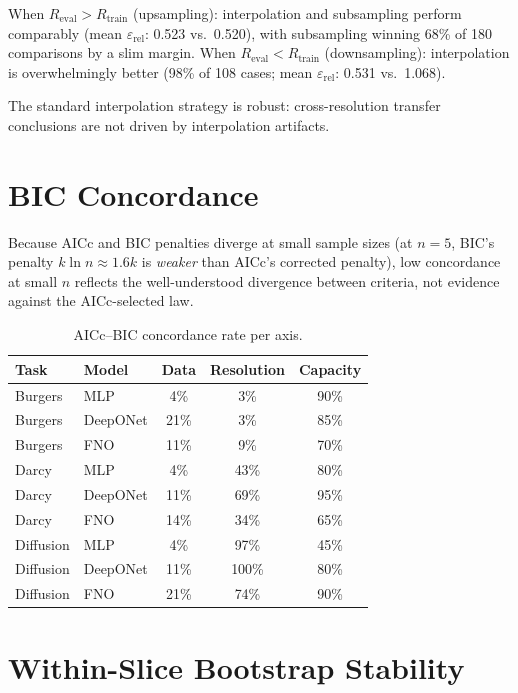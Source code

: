 \documentclass[11pt]{article}
\newcommand{\Reval}{R_{\mathrm{eval}}}
\newcommand{\Rtrain}{R_{\mathrm{train}}}
\newcommand{\relLtwo}{\varepsilon_{\mathrm{rel}}}
\begin{document}
When $\Reval > \Rtrain$ (upsampling): interpolation and subsampling
perform comparably (mean $\relLtwo$: 0.523 vs.\ 0.520), with
subsampling winning 68\% of 180 comparisons by a slim margin.
When $\Reval < \Rtrain$ (downsampling): interpolation is overwhelmingly
better (98\% of 108 cases; mean $\relLtwo$: 0.531 vs.\ 1.068).

The standard interpolation strategy is robust: cross-resolution
transfer conclusions are not driven by interpolation artifacts.


\section{BIC Concordance}
\label{app:bic}

Because AICc and BIC penalties diverge at small sample sizes
(at $n = 5$, BIC's penalty $k \ln n \approx 1.6k$ is \emph{weaker}
than AICc's corrected penalty), low concordance at small $n$ reflects
the well-understood divergence between criteria, not evidence against
the AICc-selected law.

\begin{table}[h]
\centering
\caption{AICc--BIC concordance rate per axis.}
\label{tab:bic}
\begin{tabular}{@{}llccc@{}}
\toprule
\textbf{Task} & \textbf{Model} & \textbf{Data} & \textbf{Resolution} &
\textbf{Capacity} \\
\midrule
Burgers   & MLP      & 4\%  & 3\%   & 90\% \\
Burgers   & DeepONet & 21\% & 3\%   & 85\% \\
Burgers   & FNO      & 11\% & 9\%   & 70\% \\
Darcy     & MLP      & 4\%  & 43\%  & 80\% \\
Darcy     & DeepONet & 11\% & 69\%  & 95\% \\
Darcy     & FNO      & 14\% & 34\%  & 65\% \\
Diffusion & MLP      & 4\%  & 97\%  & 45\% \\
Diffusion & DeepONet & 11\% & 100\% & 80\% \\
Diffusion & FNO      & 21\% & 74\%  & 90\% \\
\bottomrule
\end{tabular}
\end{table}


\section{Within-Slice Bootstrap Stability}
\label{app:bootstrap}
\end{document}
